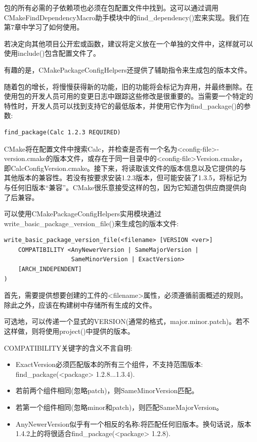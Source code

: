 包的所有必需的子依赖项也必须在包配置文件中找到。这可以通过调用CMakeFindDependencyMacro助手模块中的find\_dependency()宏来实现。我们在第7章中学习了如何使用。

若决定向其他项目公开宏或函数，建议将定义放在一个单独的文件中，这样就可以使用include()包含配置文件了。

有趣的是，CMakePackageConfigHelpers还提供了辅助指令来生成包的版本文件。


随着包的增长，将慢慢获得新的功能，旧的功能将会标记为弃用，并最终删除。在使用包的开发人员可用的变更日志中跟踪这些修改是很重要的。当需要一个特定的特性时，开发人员可以找到支持它的最低版本，并使用它作为find\_package()的参数:

\begin{lstlisting}[style=styleCMake]
find_package(Calc 1.2.3 REQUIRED)
\end{lstlisting}

CMake将在配置文件中搜索Calc，并检查是否有一个名为<config-file>-version.cmake的版本文件，或存在于同一目录中的<config-file>Version.cmake，即CalcConfigVersion.cmake。接下来，将读取该文件的版本信息以及它提供的与其他版本的兼容性。若没有按要求安装1.2.3版本，但可能安装了1.3.5，将标记为与任何旧版本“兼容”。CMake很乐意接受这样的包，因为它知道包供应商提供向了后兼容。

可以使用CMakePackageConfigHelpers实用模块通过write\_basic\_package\_version\_file()来生成包的版本文件:

\begin{lstlisting}[style=styleCMake]
write_basic_package_version_file(<filename> [VERSION <ver>]
	COMPATIBILITY <AnyNewerVersion | SameMajorVersion |
				   SameMinorVersion | ExactVersion>
	[ARCH_INDEPENDENT]
)
\end{lstlisting}

首先，需要提供想要创建的工件的<filename>属性，必须遵循前面概述的规则。除此之外，应该在构建树中存储所有生成的文件。

可选地，可以传递一个显式的VERSION(通常的格式，major.minor.patch)。若不这样做，则将使用project()中提供的版本。

COMPATIBILITY关键字的含义不言自明:

\begin{itemize}
\item 
ExactVersion必须匹配版本的所有三个组件，不支持范围版本: find\_package(<package> 1.2.8...1.3.4).

\item 
若前两个组件相同(忽略patch)，则SameMinorVersion匹配。

\item 
若第一个组件相同(忽略minor和patch)，则匹配SameMajorVersion。

\item 
AnyNewerVersion似乎有一个相反的名称:将匹配任何旧版本。换句话说，版本1.4.2上的将很适合find\_package(<package> 1.2.8).
\end{itemize}

